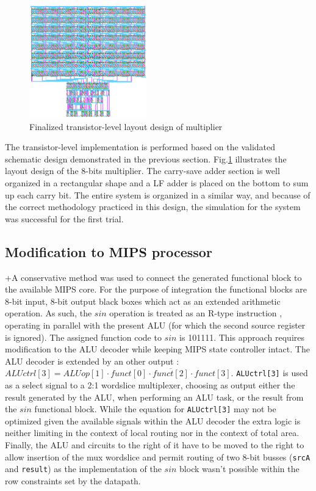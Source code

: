 \documentclass[10pt,journal]{IEEEtran}
\begin{document}
\begin{figure}[h]
\centering
\includegraphics[width=2in]{finalized_transistor_design.png}
\caption{Finalized transistor-level layout design of multiplier}
\label{finalized_transistor_design}
\end{figure}

The transistor-level implementation is performed based on the validated schematic design demonstrated in the previous section. Fig.\ref{finalized_transistor_design} illustrates the layout design of the 8-bits multiplier. The carry-save adder section is well organized in a rectangular shape and a LF adder is placed on the bottom to sum up each carry bit. The entire system is organized in a similar way, and because of the correct methodology practiced in this design, the simulation for the system was successful for the first trial.

\subsection{Modification to MIPS processor}
+A conservative method was used to connect the generated functional block to the available MIPS core. For the purpose of integration the functional blocks are 8-bit input, 8-bit output black boxes which act as an extended arithmetic operation. As such, the $sin$ operation  is treated as an R-type instruction , operating in parallel with the present ALU (for which the second source register is ignored). The assigned function code to $sin$ is 101111. This approach requires modification to the ALU decoder while keeping MIPS state controller intact. The ALU decoder is extended by an other output : \texttt{$ALUctrl[3] =  ALUop[1] \cdot \overline{funct[0] \cdot funct[2] \cdot funct[3]}$}. \texttt{ALUctrl[3]} is used as a select signal to a 2:1 wordslice multiplexer, choosing as output either the result generated by the ALU, when performing an ALU task, or the result from the $sin$ functional block. While the equation for \texttt{ALUctrl[3]} may not be optimized given the available signals within the ALU decoder the extra logic is neither limiting in the context of local routing nor in the context of total area. Finally, the ALU and circuits to the right of it have to be moved to the right to allow insertion of the mux wordslice and permit routing of two 8-bit busses (\texttt{srcA} and \texttt{result}) as the implementation of the $sin$ block wasn't possible within the row constraints set by the datapath.
\end{document}
